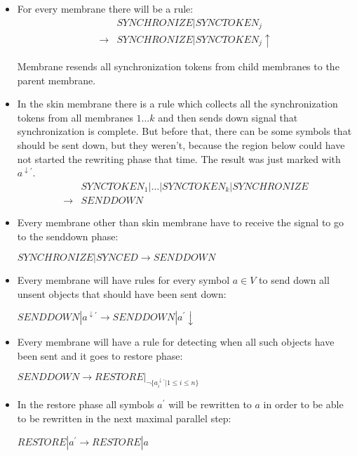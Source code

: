 \begin{dokaz}
\begin{itemize}
    \item For every membrane there will be a rule:
    \begin{align*}
      &\mathit{SYNCHRONIZE}|\mathit{SYNCTOKEN_j} \\
      \rightarrow &\mathit{SYNCHRONIZE}|\mathit{SYNCTOKEN_j}\uparrow
    \end{align*}

    Membrane resends all synchronization tokens from child membranes to the parent membrane.

    \item In the skin membrane there is a rule which collects all the synchronization tokens from all membranes $1\dots k$ and then sends down signal that synchronization is complete. But before that, there can be some symbols that should be sent down, but they weren't, because the region below could have not started the rewriting phase that time. The result was just marked with $a^{\downarrow\prime}$.
    \begin{align*}
      &\mathit{SYNCTOKEN_1}|\dots|\mathit{SYNCTOKEN_k}|\mathit{SYNCHRONIZE} \\
      \rightarrow &\mathit{SENDDOWN}
    \end{align*}

    \item Every membrane other than skin membrane have to receive the signal to go to the senddown phase:

    $\mathit{SYNCHRONIZE}|\mathit{SYNCED} \rightarrow \mathit{SENDDOWN}$

    \item Every membrane will have rules for every symbol $a\in V$ to send down all unsent objects that should have been sent down:

    $\mathit{SENDDOWN}|a^{\downarrow\prime} \rightarrow \mathit{SENDDOWN}|a^{\prime}\downarrow$

    \item Every membrane will have a rule for detecting when all such objects have been sent and it goes to restore phase:

    $\mathit{SENDDOWN} \rightarrow \mathit{RESTORE}|_{\neg \{a_i^{\downarrow\prime}|1\leq i\leq n\}}$

    \item In the restore phase all symbols $a^{\prime}$ will be rewritten to $a$ in order to be able to be rewritten in the next maximal parallel step:

    $\mathit{RESTORE}|a^{\prime} \rightarrow \mathit{RESTORE}|a$


\end{itemize}
\end{dokaz}
